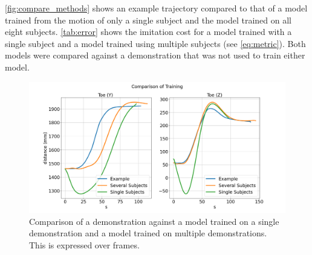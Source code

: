 \autoref{fig:compare_methods} shows an example trajectory compared to that of a model trained from the motion of only a single subject and the model trained on all eight subjects. \autoref{tab:error} shows the imitation cost for a model trained with a single subject and a model trained using multiple subjects (see \autoref{eq:metric}). Both models were compared against a demonstration that was not used to train either model.  




% 

\begin{figure}[h]
    \centering 
    \includegraphics[scale=0.20]{images/compare_method.png} 
    \caption{Comparison of a demonstration against a model trained on a single demonstration and a model trained on multiple demonstrations. This is expressed over frames. } 
    \label{fig:compare_methods} 
\end{figure} 

